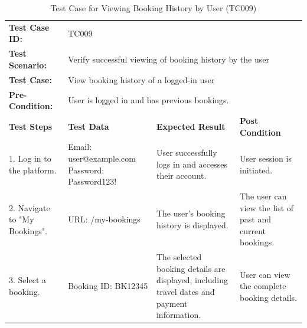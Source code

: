 \documentclass{scrreprt}
\begin{document}
    \begin{longtable}{| m{2cm} | m{5cm} | m{4cm} | m{3cm} |}
    \caption{Test Case for Viewing Booking History by User (TC009)}
    \vspace{0.5cm} \\ \hline
    \textbf{Test Case ID:} & \multicolumn{3}{l|}{TC009} \\ \hline
    \textbf{Test Scenario:} & \multicolumn{3}{l|}{Verify successful viewing of booking history by the user} \\ \hline
    \textbf{Test Case:} & \multicolumn{3}{l|}{View booking history of a logged-in user} \\ \hline
    \textbf{Pre-Condition:} & \multicolumn{3}{l|}{User is logged in and has previous bookings.} \\ \hline
    \textbf{Test Steps} & \textbf{Test Data} & \textbf{Expected Result} & \textbf{Post Condition} \\ \hline
    1. Log in to the platform. & Email: user@example.com \newline Password: Password123! & User successfully logs in and accesses their account. & User session is initiated. \\ \hline
    2. Navigate to "My Bookings". & URL: /my-bookings & The user's booking history is displayed. & The user can view the list of past and current bookings. \\ \hline
    3. Select a booking. & Booking ID: BK12345 & The selected booking details are displayed, including travel dates and payment information. & User can view the complete booking details. \\ \hline
    \end{longtable}
    
    \vspace{1cm}
    
\end{document}
